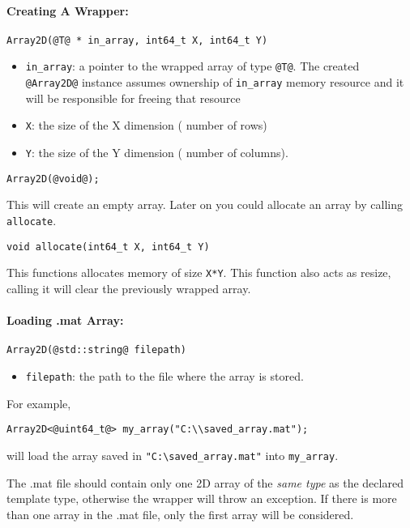 \documentclass[12pt,letterpaper]{article}
\makeatletter
\def\keyhl[#1]{\lstinline{@#1@}}
\makeatother
\begin{document}
\paragraph{Creating A Wrapper:}\hspace{-2ex}
\begin{lstlisting}
Array2D(@T@ * in_array, int64_t X, int64_t Y)
\end{lstlisting}
\begin{itemize}
\item \lstinline{in_array}: a pointer to the wrapped array of type \lstinline{@T@}. The created \keyhl[Array2D] instance assumes ownership of \lstinline{in_array} memory resource and it will be responsible for freeing that resource
\item \lstinline{X}: the size of the X dimension ( number of rows)
\item \lstinline{Y}: the size of the Y dimension ( number of columns).
\end{itemize}

\begin{lstlisting}
Array2D(@void@);
\end{lstlisting}
This will create an empty array. Later on you could allocate an array by calling \lstinline{allocate}.
\begin{lstlisting}[backgroundcolor=\color{white}]
void allocate(int64_t X, int64_t Y)
\end{lstlisting}
This functions allocates memory of size \lstinline{X*Y}. This function also acts as resize, calling it will clear the previously wrapped array.

\paragraph{Loading .mat Array:}\hspace{-2ex}
\begin{lstlisting}
Array2D(@std::string@ filepath)
\end{lstlisting}
\begin{itemize}
\item \lstinline{filepath}: the path to the file where the array is stored.
\end{itemize}
For example,
\begin{lstlisting}[backgroundcolor=\color{white}]
Array2D<@uint64_t@> my_array("C:\\saved_array.mat");
\end{lstlisting}
will load the array saved in \lstinline{"C:\saved_array.mat"} into \lstinline{my_array}.
\begin{tcolorbox}
The .mat file should contain only one 2D array of the {\em same type} as the declared template type, otherwise the wrapper will throw an exception. If there is more than one array in the .mat file, only the first array will be considered.
\end{tcolorbox}
\end{document}
